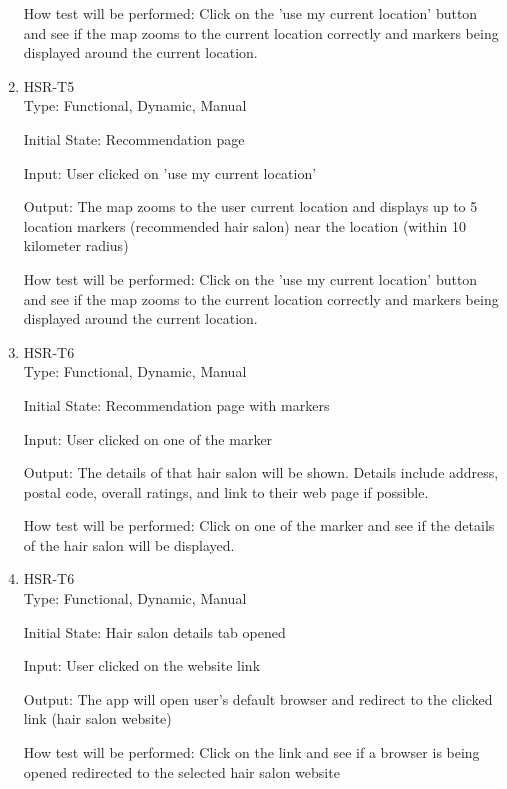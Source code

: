 \documentclass[12pt, titlepage]{article}
\begin{document}
\begin{enumerate}
How test will be performed: Click on the 'use my current location' button and see if the map zooms to the current location correctly and markers being displayed around the current location.
\item{HSR-T5}\\
Type: Functional, Dynamic, Manual
					
Initial State: Recommendation page
					
Input: User clicked on 'use my current location'
					
Output: The map zooms to the user current location and displays up to 5 location markers (recommended hair salon) near the location (within 10 kilometer radius)
					
How test will be performed: Click on the 'use my current location' button and see if the map zooms to the current location correctly and markers being displayed around the current location.
\item{HSR-T6}\\
Type: Functional, Dynamic, Manual
					
Initial State: Recommendation page with markers
					
Input: User clicked on one of the marker
					
Output: The details of that hair salon will be shown. Details include address, postal code, overall ratings, and link to their web page if possible.
					
How test will be performed: Click on one of the marker and see if the details of the hair salon will be displayed.
\item{HSR-T6}\\
Type: Functional, Dynamic, Manual
					
Initial State: Hair salon details tab opened
					
Input: User clicked on the website link
					
Output: The app will open user's default browser and redirect to the clicked link (hair salon website)
					
How test will be performed: Click on the link and see if a browser is being opened redirected to the selected hair salon website
\end{enumerate}
\end{document}
